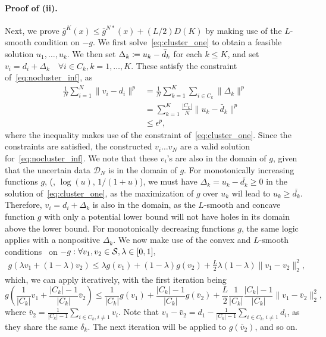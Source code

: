 \documentclass[12pt]{article}
\newcommand{\citep}{\cite}
\theoremstyle{thmstyleone}%
\theoremstyle{thmstyletwo}%
\theoremstyle{thmstylethree}%
\newcommand{\reviewChanges}{}
\begin{document}
\begin{appendices}
\paragraph{Proof of (ii).}
Next, we prove $\bar{g}^K(x) \leq \bar{g}^{N*}(x) + (L/2) D(K)$ by making use of the $L$-smooth condition on $-g$. We first solve~\eqref{eq:cluster_one} to obtain a feasible solution $u_1, \dots, u_k$. We then set $\Delta_k \coloneqq u_k - \bar{d}_k$ for each $k \leq K$, and set $v_i = d_i + \Delta_k \quad \forall i \in C_k, k = 1,\dots,K$. These satisfy the constraint of~\eqref{eq:nocluster_inf}, as
\begin{align*}
	\frac{1}{N} \sum_{i=1}^N  \| v_i - d_i \|^p &= \frac{1}{N} \sum_{k=1}^K \sum_{i \in C_k} \|\Delta_k\|^p\\
	&= \sum_{k=1}^K \frac{|C_k|}{N} \|u_k - \bar{d}_k\|^p\\
	&\leq \epsilon^p,
\end{align*}
where the inequality makes use of the constraint of~\eqref{eq:cluster_one}. Since the constraints are satisfied, the constructed $v_i \dots v_N$ are a valid solution for~\eqref{eq:nocluster_inf}.
We note that these $v_i$'s are also in the domain of $g$, given that the uncertain data $\mathcal{D}_N$ is in the domain of $g$.
\reviewChanges{For monotonically increasing functions $g$, (\eg, $\log(u)$, $1/(1+u)$), we must have $\Delta_k = u_k - \bar{d_k} \geq 0$ in the solution of~\eqref{eq:cluster_one}, as the maximization of $g$ over $u_k$ wil lead to $u_k \geq \bar{d_k}$.
Therefore, $v_i = d_i + \Delta_k$ is also in the domain, as the $L$-smooth and concave function $g$ with only a potential lower bound will not have holes in its domain above the lower bound. }
For monotonically decreasing functions $g$, the same logic applies with a nonpositive $\Delta_k$.
We now make use of the convex and $L$-smooth conditions~\citep[Theorem 5.8]{amirbeck} on $-g: \forall v_1, v_2 \in \mathcal{S}, \lambda \in [0,1],$
\begin{align*}
	g(\lambda v_1 + (1-\lambda) v_2) \leq \lambda g(v_1) + (1 - \lambda)g(v_2) + \frac{L}{2}\lambda(1 - \lambda)\| v_1 - v_2 \|^2_2,
\end{align*}
\reviewChanges{which, we can apply iteratively, with the first iteration being
$$ g\left (\frac{1}{|C_k|} v_1 + \frac{|C_k|-1}{|C_k|} \bar{v}_2\right ) \leq \frac{1}{|C_k|}g(v_1) + \frac{|C_k|-1}{|C_k|}g(\bar{v}_2) + \frac{L}{2}\frac{1}{|C_k|}\frac{|C_k|-1}{|C_k|}\| v_1 - \bar{v}_2 \|^2_2, $$
where $\bar{v}_2 = \frac{1}{|C_k|-1}\sum_{i \in C_k, i\neq 1} v_i$. Note that $v_1 - \bar{v}_2 = d_1 - \frac{1}{|C_k|-1}\sum_{i \in C_k, i\neq 1} d_i$, as they share the same $\delta_k$. The next iteration will be applied to $g(\bar{v}_2)$, and so on.} 

\end{appendices}
\end{document}
